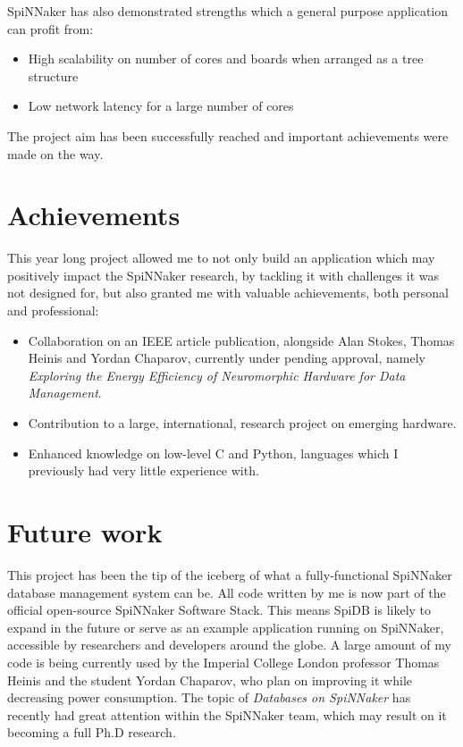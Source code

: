 SpiNNaker has also demonstrated strengths which a general purpose application can profit from:
\begin{itemize}
\setlength\itemsep{-0.1em}
	\item High scalability on number of cores and boards when arranged as a tree structure
	\item Low network latency for a large number of cores
\end{itemize}

The project aim has been successfully reached and important achievements were made on the way.

\section{Achievements}
This year long project allowed me to not only build an application which may positively impact the SpiNNaker research, by tackling it with challenges it was not designed for, but also granted me with valuable achievements, both personal and professional:

\begin{itemize}
	\item Collaboration on an IEEE article publication, alongside Alan Stokes, Thomas Heinis and Yordan Chaparov, currently under pending approval, namely \textit{Exploring the Energy Efficiency of Neuromorphic Hardware for Data Management}.
	\item Contribution to a large, international, research project on emerging hardware.
	\item Enhanced knowledge on low-level C and Python, languages which I previously had very little experience with.
\end{itemize}

\section{Future work}
This project has been the tip of the iceberg of what a fully-functional SpiNNaker database management system can be. All code written by me is now part of the official open-source SpiNNaker Software Stack. This means SpiDB is likely to expand in the future or serve as an example application running on SpiNNaker, accessible by researchers and developers around the globe. A large amount of my code is being currently used by the Imperial College London professor Thomas Heinis and the student Yordan Chaparov, who plan on improving it while decreasing power consumption. The topic of \textit{Databases on SpiNNaker} has recently had great attention within the SpiNNaker team, which may result on it becoming a full Ph.D research.

